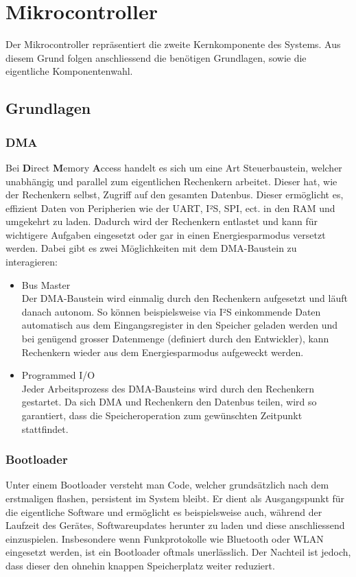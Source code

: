 \documentclass[12pt]{article}
\begin{document}
	\section{Mikrocontroller}\label{Mikrocontroller}
	Der Mikrocontroller repräsentiert die zweite Kernkomponente des Systems. Aus diesem Grund folgen anschliessend die benötigen Grundlagen, sowie die eigentliche Komponentenwahl.
	\subsection{Grundlagen}
	\subsubsection*{DMA}
	Bei \textbf{D}irect \textbf{M}emory \textbf{A}ccess handelt es sich um eine Art Steuerbaustein, welcher unabhängig und parallel zum eigentlichen Rechenkern arbeitet. Dieser hat, wie der Rechenkern selbst, Zugriff auf den gesamten Datenbus. Dieser ermöglicht es, effizient Daten von Peripherien wie der UART, I²S, SPI, ect. in den RAM und umgekehrt zu laden. Dadurch wird der Rechenkern entlastet und kann für wichtigere Aufgaben eingesetzt oder gar in einen Energiesparmodus versetzt werden. Dabei gibt es zwei Möglichkeiten mit dem DMA-Baustein zu interagieren:
	\begin{itemize}
		\item Bus Master \\
		Der DMA-Baustein wird einmalig durch den Rechenkern aufgesetzt und läuft danach autonom. So können beispielsweise via I²S einkommende Daten automatisch aus dem Eingangsregister in den Speicher geladen werden und bei genügend grosser Datenmenge (definiert durch den Entwickler), kann Rechenkern wieder aus dem Energiesparmodus aufgeweckt werden.
		\item Programmed I/O \\
		Jeder Arbeitsprozess des DMA-Bausteins wird durch den Rechenkern gestartet. Da sich DMA und Rechenkern den Datenbus teilen, wird so garantiert, dass die Speicheroperation zum gewünschten Zeitpunkt stattfindet.
	\end{itemize}
	\subsubsection*{Bootloader}
	Unter einem Bootloader versteht man Code, welcher grundsätzlich nach dem erstmaligen flashen, persistent im System bleibt. Er dient als Ausgangspunkt für die eigentliche Software und ermöglicht es beispielsweise auch, während der Laufzeit des Gerätes, Softwareupdates herunter zu laden und diese anschliessend einzuspielen. Insbesondere wenn Funkprotokolle wie Bluetooth oder WLAN eingesetzt werden, ist ein Bootloader oftmals unerlässlich. Der Nachteil ist jedoch, dass dieser den ohnehin knappen Speicherplatz weiter reduziert.
\end{document}

